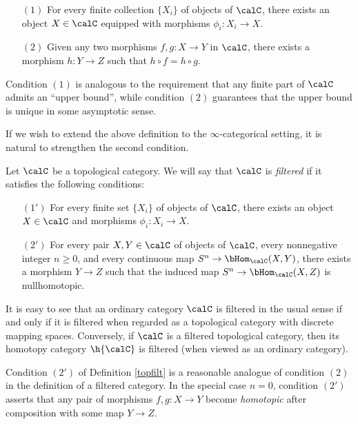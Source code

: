 \begin{itemize}
\item[$(1)$] For every finite collection $\{ X_i \}$ of objects of $\calC$, there exists an object
$X \in \calC$ equipped with morphisms $\phi_i: X_i \rightarrow X$.

\item[$(2)$]  Given any two morphisms $f,g: X \rightarrow Y$ in $\calC$,
there exists a morphism $h: Y \rightarrow Z$ such that $h \circ f
= h \circ g$.
\end{itemize}

Condition $(1)$ is analogous to the requirement that any
finite part of $\calC$ admits an ``upper bound'', while condition $(2)$ guarantees that the upper bound is unique in some asymptotic sense.

If we wish to extend the above definition to the $\infty$-categorical setting, it is natural to strengthen the second condition.

\begin{definition}\label{topfilt}
Let $\calC$ be a topological category. We will say that $\calC$ is {\it filtered} if it satisfies
the following conditions:
\begin{itemize}
\item[$(1')$] For every finite set $\{X_i\}$ of objects of $\calC$, there exists an object $X \in \calC$
and morphisms $\phi_i: X_i \rightarrow X$.
\item[$(2')$] For every pair $X, Y \in \calC$ of objects of $\calC$, every nonnegative integer $n \geq 0$, and every continuous map $S^n \rightarrow \bHom_{\calC}(X,Y)$, there exists a morphism $Y \rightarrow Z$ such that the induced map $S^n \rightarrow \bHom_{\calC}(X,Z)$ is nullhomotopic.
\end{itemize}
\end{definition}

\begin{remark}
It is easy to see that an ordinary category $\calC$ is filtered in the usual sense if and only if it is filtered when regarded as a topological category with discrete mapping spaces. Conversely, 
if $\calC$ is a filtered topological category, then its homotopy category $\h{\calC}$ is filtered (when viewed as an ordinary category). 
\end{remark}

\begin{remark}
Condition $(2')$ of Definition \ref{topfilt} is a reasonable analogue of condition $(2)$ in the definition of a filtered category. In the special case $n=0$, condition $(2')$ asserts that any pair of morphisms
$f,g: X \rightarrow Y$ become {\em homotopic} after composition with some map $Y \rightarrow Z$.
\end{remark}

